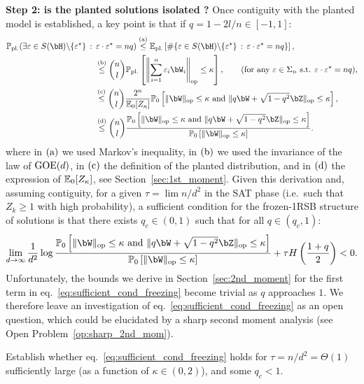 \myskip
\textbf{Step 2: is the planted solutions isolated ?}
Once contiguity with the planted model is established, a key point is that if $q = 1 - 2 l / n \in [-1,1]$:
\begin{align*}
    \bbP_\pl(\exists \eps \in S(\bH) \backslash \{\eps^\star\} \, : \,  \eps \cdot \eps^\star = n q) 
    &\aleq 
    \EE_\pl \left[\# \{\eps \in S(\bH) \backslash \{\eps^\star\} \, : \, \eps \cdot \eps^\star = n q\}\right], \\ 
    &\hspace{-50pt}\bleq \binom{n}{l} \bbP_{\pl} \left[\left\|\sum_{i=1}^n \eps_i \bW_i\right\|_\op \leq \kappa\right], \hspace{20pt} (\textrm{for any } \eps \in \Sigma_n \textrm{ s.t. } \eps \cdot \eps^\star = n q), \\
    &\hspace{-50pt}\cleq \binom{n}{l} \frac{2^n}{\EE_0[Z_\kappa]} \bbP_{0} \left[\|\bW\|_\op \leq \kappa \textrm{ and } \|q \bW + \sqrt{1-q^2} \bZ\|_\op \leq \kappa\right], \\
    &\hspace{-50pt}\dleq \binom{n}{l} \frac{\bbP_{0} \left[\|\bW\|_\op \leq \kappa \textrm{ and } \|q \bW + \sqrt{1-q^2} \bZ\|_\op \leq \kappa\right]}{\bbP_{0} \left[\|\bW\|_\op \leq \kappa\right]}.
\end{align*}
where in $(\rm a)$ we used Markov's inequality, in $(\rm b)$ we used the invariance of the law of $\mathrm{GOE}(d)$, in $(\rm c)$ the definition of the planted distribution, and in $(\rm d)$ the expression of $\mathbb{E}_0[Z_\kappa]$, see Section~\ref{sec:1st_moment}.
Given this derivation and, assuming contiguity, for a given $\tau = \lim n / d^2$ in the SAT phase (i.e.\ such that $Z_k \geq 1$ with high probability), a sufficient condition for the frozen-1RSB structure of solutions 
is that there exists $q_c \in (0,1)$ such that for all $q \in (q_c, 1)$: 
\begin{align}\label{eq:sufficient_cond_freezing}
    \lim_{d \to \infty} \frac{1}{d^2} \log \frac{\bbP_0 \left[\|\bW\|_\op \leq \kappa \textrm{ and } \|q \bW + \sqrt{1-q^2} \bZ\|_\op \leq \kappa\right]}{\bbP_0 \left[\|\bW\|_\op \leq \kappa\right]} + \tau H\left(\frac{1+q}{2}\right) < 0.
\end{align}
Unfortunately, the bounds we derive in Section~\ref{sec:2nd_moment} for the first term in eq.~\eqref{eq:sufficient_cond_freezing} become trivial as $q$ approaches $1$. 
We therefore leave an investigation of eq.~\eqref{eq:sufficient_cond_freezing} as an open question, which could be elucidated by a sharp second moment analysis (see Open Problem~\ref{op:sharp_2nd_mom}).
\begin{openquestion}[Second moment potential close to $q = 1$]
    Establish whether eq.~\eqref{eq:sufficient_cond_freezing} holds for $\tau = n /d^2 = \Theta(1)$ sufficiently large (as a function of $\kappa \in (0,2)$), and some $q_c < 1$.
\end{openquestion}